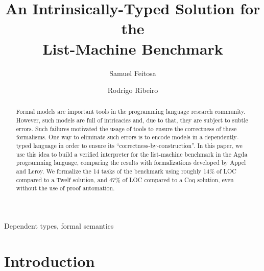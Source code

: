 \documentclass[review]{elsarticle}
\theoremstyle{definition}
\begin{document}
\begin{frontmatter}

\title{An Intrinsically-Typed Solution for the\\ List-Machine Benchmark}

\author{Samuel Feitosa}
\address{%
  Departamento de Informática - Instituto Federal de Santa Catarina \\
  Caçador - Santa Catarina - Brazil
}

\author{Rodrigo Ribeiro}
\address{
  Prog. Pós Graduação em Ciência da Computação - Universidade Federal de Ouro Preto \\
  Ouro Preto - Minas Gerais - Brazil}



\begin{abstract}
Formal models are important tools in the programming language research
community. However, such models are full of intricacies and, due to that,
they are subject to subtle errors. Such failures motivated the usage of
tools to ensure the correctness of these formalisms. One way to eliminate
such errors is to encode models in a dependently-typed language in order
to ensure its ``correctness-by-construction''. In this paper, we use this
idea to build a verified interpreter for the list-machine benchmark in the
Agda programming language, comparing the results with formalizations developed
by Appel and Leroy. We formalize the 14 tasks of the benchmark
using roughly 14\% of LOC compared to a Twelf solution, and 47\% of LOC
compared to a Coq solution, even without the use of proof automation.
\end{abstract}


\begin{keyword}
Dependent types, formal semantics
\end{keyword}

\end{frontmatter}

\linenumbers






\section{Introduction}
\end{document}
